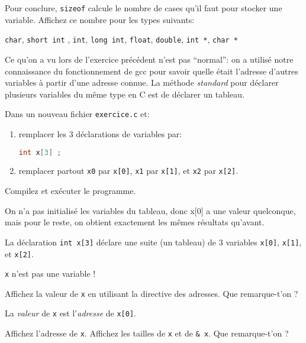 \question Pour conclure, \texttt{sizeof} calcule le nombre de cases
qu'il faut pour stocker une variable. Affichez ce nombre pour les types suivants:
\begin{center}
  \texttt{char}, \texttt{short int} , \texttt{int}, \texttt{long int}, \texttt{float}, \texttt{double}, \texttt{int *}, \texttt{char *}
\end{center}



Ce qu'on a vu lors de l'exercice précédent n'est pas ``normal'': on a
utilisé notre connaissance du fonctionnement de gcc pour savoir quelle
était l'adresse d'autres variables à partir d'une adresse connue. La
méthode \emph{standard} pour déclarer plusieurs variables du même type
en C est de déclarer un tableau.

\question Dans un nouveau fichier
\texttt{exercice\label{exercicenum}.c} et:
\begin{enumerate}
\item remplacer les 3 déclarations de variables par:
  \begin{lstlisting}[language=C]
    int x[3] ;
  \end{lstlisting}
\item remplacer partout \texttt{x0} par \texttt{x[0]}, \texttt{x1} par
  \texttt{x[1]}, et \texttt{x2} par \texttt{x[2]}.
\end{enumerate}
Compilez et exécuter le programme.

\begin{solution}
  On n'a pas initialisé les variables du tableau, donc x[0] a une
  valeur quelconque, mais pour le reste, on obtient exactement les
  mêmes résultats qu'avant.
\end{solution}

\begin{fminipage}{0.9\textwidth}
  La déclaration \texttt{int x[3]} déclare une suite (un tableau) de 3
  variables \texttt{x[0]}, \texttt{x[1]}, et \texttt{x[2]}.

  \large \texttt{x} n'est pas une variable !
\end{fminipage}

\question Affichez la valeur de \texttt{x} en utilisant la directive
des adresses. Que remarque-t'on ?

\begin{solution}
  La \emph{valeur} de \texttt{x} est l'\emph{adresse} de \texttt{x[0]}.
\end{solution}

\question Affichez l'adresse de \texttt{x}. Affichez les tailles de \texttt{x} et de \texttt{\& x}. Que remarque-t'on ?



